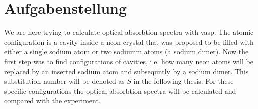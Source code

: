 \chapter{Aufgabenstellung}
\label{chap:Aufgabenstellung}
%
We are here trying to calculate optical absorbtion spectra with vasp. The atomic configuration is a cavity inside a neon crystal that was proposed to be filled with either a single sodium atom or two sodiumm atoms (a sodium dimer). Now the first step was to find configurations of cavities, i.e. how many neon atoms will be replaced by an inserted sodium atom and subsequntly by a sodium dimer. This substitution number will be denoted as $S$ in the following thesis. For these specific configurations the optical absorbtion spectra will be calculated and compared with the experiment.
%